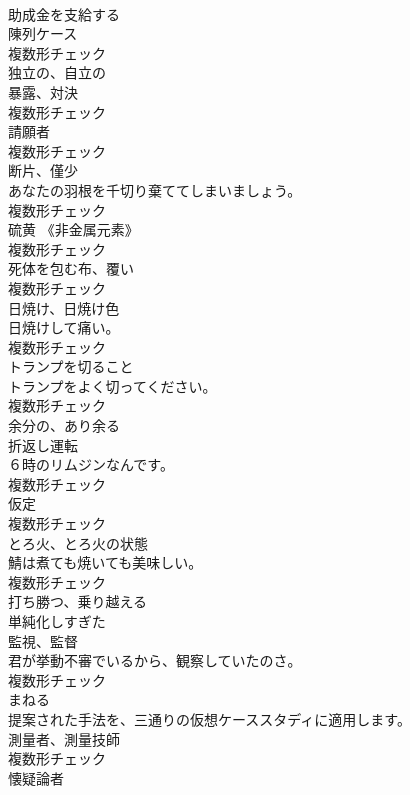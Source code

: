 \documentclass[8pt]{extreport}
\begin{document}
\begin{CJK}{UTF8}{min}
\\	[動詞]	助成金を支給する	
\\	[名詞]	陳列ケース	
\\	複数形チェック
\\	[形容詞]	独立の、自立の	
\\	[名詞]	暴露、対決	
\\	複数形チェック
\\	[名詞]	請願者	
\\	複数形チェック
\\	[名詞]	断片、僅少	
\\	あなたの羽根を千切り棄ててしまいましょう。	
\\	複数形チェック
\\	[名詞]	硫⻩ 《非金属元素》	
\\	複数形チェック
\\	[名詞]	死体を包む布、覆い	
\\	複数形チェック
\\	[名詞]	日焼け、日焼け色	
\\	日焼けして痛い。	
\\	複数形チェック
\\	[名詞]	トランプを切ること	
\\	トランプをよく切ってください。	
\\	複数形チェック
\\	[形容詞]	余分の、あり余る	
\\	[名詞]	折返し運転	
\\	６時のリムジンなんです。	
\\	複数形チェック
\\	[名詞]	仮定	
\\	複数形チェック
\\	[名詞]	とろ火、とろ火の状態	
\\	鯖は煮ても焼いても美味しい。	
\\	複数形チェック
\\	[動詞]	打ち勝つ、乗り越える	
\\	[形容詞]	単純化しすぎた	
\\	[名詞]	監視、監督	
\\	君が挙動不審でいるから、観察していたのさ。	
\\	複数形チェック
\\	[動詞]	まねる	
\\	提案された手法を、三通りの仮想ケーススタディに適用します。	
\\	[名詞]	測量者、測量技師	
\\	複数形チェック
\\	[名詞]	懐疑論者	

\end{CJK}
\end{document}
